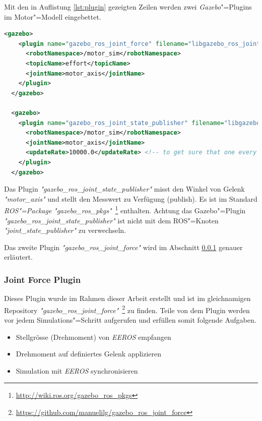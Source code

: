 Mit den in Auflistung \ref{lst:plugin} gezeigten Zeilen werden zwei \textit{Gazebo}"=Plugins im Motor"=Modell eingebettet.
\begin{lstlisting}[language=xml, captionpos=b, caption=Plugin in URDF, label={lst:plugin}, gobble=2]
  <gazebo>
    <plugin name="gazebo_ros_joint_force" filename="libgazebo_ros_joint_force.so">
      <robotNamespace>/motor_sim</robotNamespace>
      <topicName>effort</topicName>
      <jointName>motor_axis</jointName>
    </plugin>
  </gazebo>

  <gazebo>
    <plugin name="gazebo_ros_joint_state_publisher" filename="libgazebo_ros_joint_state_publisher.so">
      <robotNamespace>/motor_sim</robotNamespace>
      <jointName>motor_axis</jointName>
      <updateRate>10000.0</updateRate> <!-- to get sure that one every sim step called, up to 10k -->
    </plugin>
  </gazebo>
\end{lstlisting}
Das Plugin \textit{\textit{"}gazebo\_ros\_joint\_state\_publisher\textit{"}} misst den Winkel von Gelenk \textit{\textit{"}motor\_axis\textit{"}} und stellt den Messwert zu Verfügung (publish).
Es ist im Standard \textit{ROS"=Package} \textit{\textit{"}gazebo\_ros\_pkgs\textit{"}}~\footnote{\url{http://wiki.ros.org/gazebo_ros_pkgs}} enthalten.
Achtung das Gazebo"=Plugin \textit{\textit{"}gazebo\_ros\_joint\_state\_publisher\textit{"}} ist nicht mit dem ROS"=Knoten \textit{\textit{"}joint\_state\_publisher\textit{"}} zu verwechseln.

Das zweite Plugin \textit{\textit{"}gazebo\_ros\_joint\_force\textit{"}} wird im Abschnitt \ref{chap:joint-force-plugin} genauer erläutert.

\subsubsection{Joint Force Plugin}
\label{chap:joint-force-plugin}
Dieses Plugin wurde im Rahmen dieser Arbeit erstellt und ist im gleichnamigen Repository \textit{\textit{"}gazebo\_ros\_joint\_force\textit{"}}~\footnote{\url{https://github.com/manuelilg/gazebo_ros_joint_force}} zu finden.
Teile von dem Plugin werden vor jedem Simulations"=Schritt aufgerufen und erfüllen somit folgende Aufgaben.
\begin{itemize}
\item Stellgrösse (Drehmoment) von \textit{EEROS} empfangen
\item Drehmoment auf definiertes Gelenk applizieren
\item Simulation mit \textit{EEROS} synchronisieren
\end{itemize}

